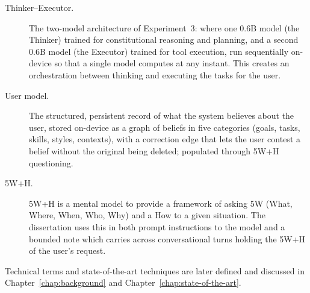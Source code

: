 \begin{description}
  \item[Thinker--Executor.] The two-model architecture of Experiment~3: where one 0.6B model (the Thinker) trained for constitutional reasoning and planning, and a second 0.6B model (the Executor) trained for tool execution, run sequentially on-device so that a single model computes at any instant. This creates an orchestration between thinking and executing the tasks for the user.
  \item[User model.] The structured, persistent record of what the system believes about the user, stored on-device as a graph of beliefs in five categories (goals, tasks, skills, styles, contexts), with a correction edge that lets the user contest a belief without the original being deleted; populated through 5W+H questioning.
  \item[5W+H.] 5W+H is a mental model to provide a framework of asking 5W (What, Where, When, Who, Why) and a How to a given situation. The dissertation uses this in both prompt instructions to the model and a bounded note which carries across conversational turns holding the 5W+H of the user's request.
\end{description}

Technical terms and state-of-the-art techniques are later defined and discussed in Chapter~\ref{chap:background} and Chapter~\ref{chap:state-of-the-art}.

